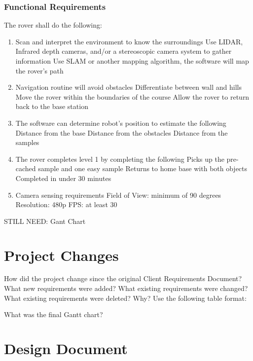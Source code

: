 \documentclass[10pt, oneside,onecolumn]{IEEEtran}
\begin{document}
\subsubsection{Functional Requirements}
The rover shall do the following:
\begin{enumerate}
\item Scan and interpret the environment to know the surroundings
\subitem Use LIDAR, Infrared depth cameras, and/or a stereoscopic camera system to gather information
\subitem Use SLAM or another mapping algorithm, the software will map the rover's path

\item Navigation routine will avoid obstacles 
\subitem Differentiate between wall and hills
\subitem Move the rover within the boundaries of the course
\subitem Allow the rover to return back to the base station

\item The software can determine robot's position to estimate the following
\subitem Distance from the base
\subitem Distance from the obstacles 
\subitem Distance from the samples
	
\item The rover completes level 1 by completing the following
\subitem Picks up the pre-cached sample and one easy sample
\subitem Returns to home base with both objects
\subitem Completed in under 30 minutes

\item Camera sensing requirements 								
\subitem Field of View: minimum of 90 degrees 
\subitem Resolution: 480p
\subitem FPS: at least 30
\end{enumerate}


STILL NEED: Gant Chart

\section{Project Changes}

How did the project change since the original Client Requirements Document?
What new requirements were added? What existing requirements were changed? What existing requirements were deleted? Why?
Use the following table format:

What was the final Gantt chart?

\section{Design Document}
\end{document}
